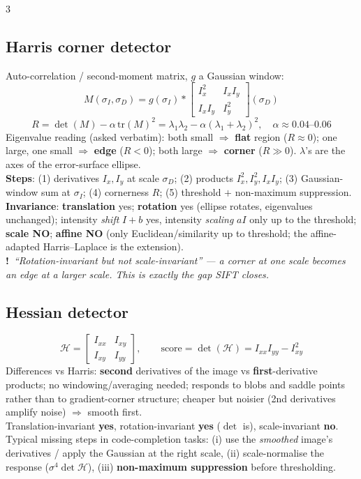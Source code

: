 \documentclass[9pt,a4paper,landscape]{extarticle}
\newcommand{\key}[1]{\textbf{#1}}
\newcommand{\tr}[1]{{\color{trap}\textbf{!}}\ \textit{#1}}
\begin{document}
\begin{multicols}{3}
\subsection{Harris corner detector}
Auto-correlation / second-moment matrix, $g$ a Gaussian window:
$$M(\sigma_I,\sigma_D)=g(\sigma_I)*\begin{bmatrix}I_x^2 & I_xI_y\\ I_xI_y & I_y^2\end{bmatrix}\!(\sigma_D)$$
$$R=\det(M)-\alpha\,\mathrm{tr}(M)^2=\lambda_1\lambda_2-\alpha(\lambda_1+\lambda_2)^2,\quad \alpha\approx0.04\text{--}0.06$$
Eigenvalue reading (asked verbatim): both small $\Rightarrow$ \key{flat} region ($R\approx0$); one large, one small $\Rightarrow$ \key{edge} ($R<0$); both large $\Rightarrow$ \key{corner} ($R\gg0$). $\lambda$'s are the axes of the error-surface ellipse.\\
\textbf{Steps}: (1) derivatives $I_x,I_y$ at scale $\sigma_D$; (2) products $I_x^2,I_y^2,I_xI_y$; (3) Gaussian-window sum at $\sigma_I$; (4) cornerness $R$; (5) threshold $+$ non-maximum suppression.\\
\textbf{Invariance}: \key{translation} yes; \key{rotation} yes (ellipse rotates, eigenvalues unchanged); intensity \emph{shift} $I+b$ yes, intensity \emph{scaling} $aI$ only up to the threshold; \key{scale NO}; \key{affine NO} (only Euclidean/similarity up to threshold; the affine-adapted Harris--Laplace is the extension).\\
\tr{``Rotation-invariant but not scale-invariant'' --- a corner at one scale becomes an edge at a larger scale. This is exactly the gap SIFT closes.}

\subsection{Hessian detector}
$$\mathcal H=\begin{bmatrix}I_{xx}&I_{xy}\\ I_{xy}&I_{yy}\end{bmatrix},\qquad \text{score}=\det(\mathcal H)=I_{xx}I_{yy}-I_{xy}^2$$
Differences vs Harris: \key{second} derivatives of the image vs \key{first}-derivative products; no windowing/averaging needed; responds to blobs and saddle points rather than to gradient-corner structure; cheaper but noisier (2nd derivatives amplify noise) $\Rightarrow$ smooth first.\\
Translation-invariant \key{yes}, rotation-invariant \key{yes} ($\det$ is), scale-invariant \key{no}.\\
Typical missing steps in code-completion tasks: (i) use the \emph{smoothed} image's derivatives / apply the Gaussian at the right scale, (ii) scale-normalise the response ($\sigma^{4}\det\mathcal H$), (iii) \key{non-maximum suppression} before thresholding.


\end{multicols}
\end{document}
